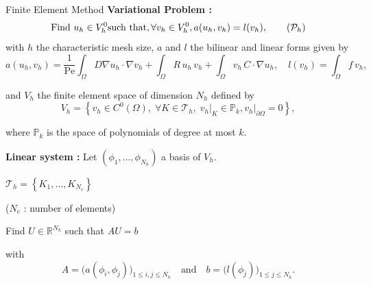 \begin{frame}{Finite Element Method}	
	\textbf{Variational Problem :} 
	\begin{equation}
		\label{eq:weakform}
		\text{Find } u_h\in V_h^0 \text{such that}, \forall v_h\in V_h^0, a(u_h,v_h)=l(v_h),
		\tag{$\mathcal{P}_h$}
	\end{equation}
	\vspace{1pt}
	with $h$ the characteristic mesh size, $a$ and $l$ the bilinear and linear forms given by
	\vspace{-3pt}
	\begin{equation*}
		a(u_h,v_h)=
		\frac{1}{\text{Pe}} \int_{\Omega}D \nabla u_h \cdot  \nabla v_h+
		\int_{\Omega} R \, u_h \, v_h  +
		\int_{\Omega} v_h \, C \cdot \nabla u_h, \quad l(v_h)=\int_{\Omega} f \, v_h,
	\end{equation*}

	\begin{minipage}[t]{0.7\linewidth}
		\vspace{-3pt}
		and $V_h$ the finite element space of dimension $N_h$ defined by
		\vspace{-3pt}
		\begin{equation*}
			V_h = \left\{v_h\in C^0(\Omega),\; \forall K\in \mathcal{T}_h,\; v_h\vert_{K}\in\mathbb{P}_k,v_h\vert_{\partial\Omega}=0\right\},
		\end{equation*}

		\vspace{-3pt}
		where $\mathbb{P}_k$ is the space of polynomials of degree at most $k$.

		\vspace{10pt}
		\textbf{Linear system :} Let $(\phi_1,\dots,\phi_{N_h})$ a basis of $V_h$.
	\end{minipage} \qquad \begin{minipage}[t][][b]{0.2\linewidth}
		\centering
		
		\footnotesize
		$\mathcal{T}_h = \left\{K_1,\dots,K_{N_e}\right\}$
		
		\tiny
		($N_e$ : number of elements)
	\end{minipage}

	\vspace{-5pt}
	Find $U\in\mathbb{R}^{N_h}$ such that \hspace{40pt} $AU=b$

	with 
	\begin{equation*}
		A=\big(a(\phi_i,\phi_j)\big)_{1\le i,j\le N_h} \quad \text{and} \quad b=\big(l(\phi_j)\big)_{1\le j\le N_h}.
	\end{equation*}
\end{frame}